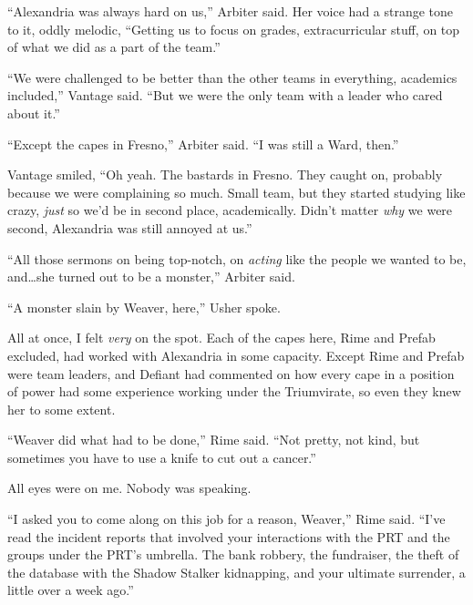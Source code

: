 ``Alexandria was always hard on us,'' Arbiter said.  Her voice had a strange tone to it, oddly melodic, ``Getting us to focus on grades, extracurricular stuff, on top of what we did as a part of the team.''



``We were challenged to be better than the other teams in everything, academics included,'' Vantage said.  ``But we were the only team with a leader who cared about it.''



``Except the capes in Fresno,'' Arbiter said.  ``I was still a Ward, then.''



Vantage smiled, ``Oh yeah.  The bastards in Fresno.  They caught on, probably because we were complaining so much.  Small team, but they started studying like crazy, \emph{just} so we'd be in second place, academically.  Didn't matter \emph{why} we were second, Alexandria was still annoyed at us.''



``All those sermons on being top-notch, on \emph{acting} like the people we wanted to be, and\ldots she turned out to be a monster,'' Arbiter said.



``A monster slain by Weaver, here,'' Usher spoke.



All at once, I felt \emph{very} on the spot.  Each of the capes here, Rime and Prefab excluded, had worked with Alexandria in some capacity.  Except Rime and Prefab were team leaders, and Defiant had commented on how every cape in a position of power had some experience working under the Triumvirate, so even they knew her to some extent.



``Weaver did what had to be done,'' Rime said.  ``Not pretty, not kind, but sometimes you have to use a knife to cut out a cancer.''



All eyes were on me.  Nobody was speaking.



``I asked you to come along on this job for a reason, Weaver,'' Rime said.  ``I've read the incident reports that involved your interactions with the PRT and the groups under the PRT's umbrella.  The bank robbery, the fundraiser, the theft of the database with the Shadow Stalker kidnapping, and your ultimate surrender, a little over a week ago.''




